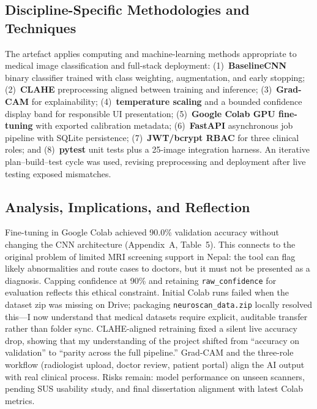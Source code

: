 \documentclass[11pt,a4paper]{article}
\begin{document}
\subsection{Discipline-Specific Methodologies and Techniques}

The artefact applies computing and machine-learning methods appropriate to medical image classification and full-stack deployment: (1)~\textbf{BaselineCNN} binary classifier trained with class weighting, augmentation, and early stopping; (2)~\textbf{CLAHE} preprocessing aligned between training and inference; (3)~\textbf{Grad-CAM} for explainability; (4)~\textbf{temperature scaling} and a bounded confidence display band for responsible UI presentation; (5)~\textbf{Google Colab GPU fine-tuning} with exported calibration metadata; (6)~\textbf{FastAPI} asynchronous job pipeline with SQLite persistence; (7)~\textbf{JWT/bcrypt RBAC} for three clinical roles; and (8)~\textbf{pytest} unit tests plus a 25-image integration harness. An iterative plan--build--test cycle was used, revising preprocessing and deployment after live testing exposed mismatches.

\subsection{Analysis, Implications, and Reflection}

Fine-tuning in Google Colab achieved 90.0\% validation accuracy without changing the CNN architecture (Appendix~A, Table~5). This connects to the original problem of limited MRI screening support in Nepal: the tool can flag likely abnormalities and route cases to doctors, but it must not be presented as a diagnosis. Capping confidence at 90\% and retaining \texttt{raw\_confidence} for evaluation reflects this ethical constraint. Initial Colab runs failed when the dataset zip was missing on Drive; packaging \texttt{neuroscan\_data.zip} locally resolved this---I now understand that medical datasets require explicit, auditable transfer rather than folder sync. CLAHE-aligned retraining fixed a silent live accuracy drop, showing that my understanding of the project shifted from ``accuracy on validation'' to ``parity across the full pipeline.'' Grad-CAM and the three-role workflow (radiologist upload, doctor review, patient portal) align the AI output with real clinical process. Risks remain: model performance on unseen scanners, pending SUS usability study, and final dissertation alignment with latest Colab metrics.

\end{document}
